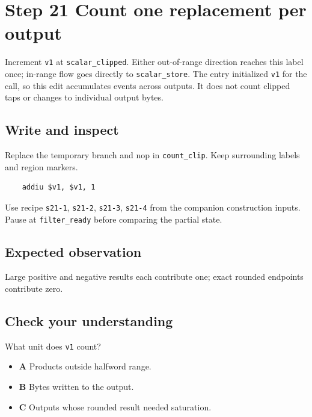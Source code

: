 \section{Step 21 Count one replacement per output}\label{fir-s21}

Increment \texttt{v1} at \texttt{scalar\_clipped}. Either out-of-range direction reaches this label once; in-range flow goes directly to \texttt{scalar\_store}. The entry initialized \texttt{v1} for the call, so this edit accumulates events across outputs. It does not count clipped taps or changes to individual output bytes.

\subsection{Write and inspect}
Replace the temporary branch and nop in \texttt{count\_clip}. Keep surrounding labels and region markers.

\begin{verbatim}
    addiu $v1, $v1, 1
\end{verbatim}
Use recipe \texttt{s21-1}, \texttt{s21-2}, \texttt{s21-3}, \texttt{s21-4} from the companion construction inputs. Pause at \texttt{filter\_ready} before comparing the partial state.

\subsection{Expected observation}
Large positive and negative results each contribute one; exact rounded endpoints contribute zero.

\subsection{Check your understanding}
What unit does \texttt{v1} count?

\begin{itemize}
  \item \textbf{A} Products outside halfword range.
  \item \textbf{B} Bytes written to the output.
  \item \textbf{C} Outputs whose rounded result needed saturation.
\end{itemize}
